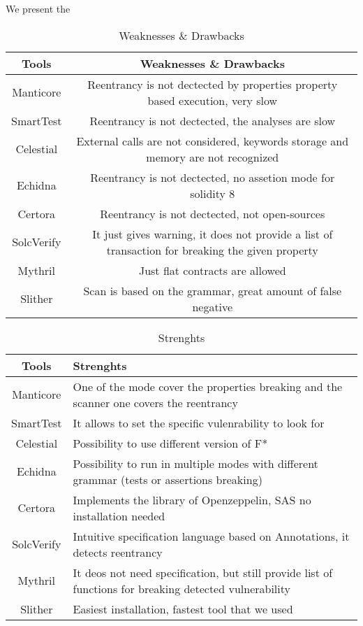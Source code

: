 We present the 
\begin{table*}
    \caption{Weaknesses \& Drawbacks}
    \label{tab:Weaknesses}
    \begin{tabular}{cc}
    \toprule
        Tools  &  Weaknesses \& Drawbacks \\
        \midrule
        Manticore & Reentrancy is not dectected by properties property based execution, very slow \\
        SmartTest & Reentrancy is not dectected, the analyses are slow \\
        Celestial & External calls are not considered, keywords storage and memory are not recognized  \\
        Echidna &  Reentrancy is not dectected, no assetion mode for solidity 8\\
        Certora & Reentrancy is not dectected, not open-sources \\ 
        SolcVerify & It just gives warning, it does not provide a list of transaction for breaking the given property\\
        Mythril & Just flat contracts are allowed \\ 
        Slither & Scan is based on the grammar, great amount of false negative \\ 
    \bottomrule
    \end{tabular}
\end{table*}

\begin{table*}
    \caption{Strenghts}
        \label{tab:Strenghts}
        \begin{tabular}{cl}
        \toprule
            Tools  &  Strenghts \\
            \midrule
            Manticore & One of the mode cover the properties breaking and the scanner one covers the reentrancy\\
            SmartTest & It allows to set the specific vulenrability to look for  \\
            Celestial & Possibility to use different version of F*  \\
            Echidna &  Possibility to run in multiple modes with different grammar (tests or assertions breaking)\\
            Certora & Implements the library of Openzeppelin, SAS no installation needed \\ 
            SolcVerify & Intuitive specification language based on Annotations, it detects reentrancy\\
            Mythril & It deos not need specification, but still provide list of functions for breaking detected vulnerability  \\ 
            Slither & Easiest installation, fastest tool that we used \\ 
        \bottomrule
        \end{tabular}
    \end{table*}

